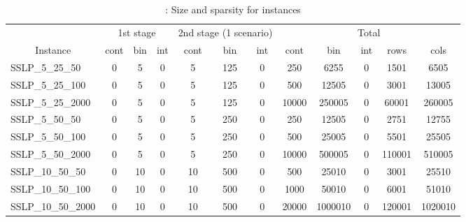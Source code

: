 \subsection{\suc}
\begin{table}[H]
	\centering
	\caption{\dcap: Size and sparsity for instances}
	\label{table:instance_size_info_dcap}
		\begin{tabular}{|l|ccc|ccc|ccccc|}
			\hline
			& \multicolumn{3}{c|}{1st stage} & \multicolumn{3}{c|}{2nd stage (1 scenario)} & \multicolumn{5}{c|}{Total}               \\ \cline{2-12} 
			\multicolumn{1}{|c|}{Instance} & cont      & bin      & int     & cont          & bin          & int          & cont  & bin     & int & rows   & cols    \\ \hline
			SSLP\_5\_25\_50                & 0         & 5        & 0       & 5             & 125          & 0            & 250   & 6255    & 0   & 1501   & 6505    \\
			SSLP\_5\_25\_100               & 0         & 5        & 0       & 5             & 125          & 0            & 500   & 12505   & 0   & 3001   & 13005   \\
			SSLP\_5\_25\_2000              & 0         & 5        & 0       & 5             & 125          & 0            & 10000 & 250005  & 0   & 60001  & 260005  \\
			SSLP\_5\_50\_50                & 0         & 5        & 0       & 5             & 250          & 0            & 250   & 12505   & 0   & 2751   & 12755   \\
			SSLP\_5\_50\_100               & 0         & 5        & 0       & 5             & 250          & 0            & 500   & 25005   & 0   & 5501   & 25505   \\
			SSLP\_5\_50\_2000              & 0         & 5        & 0       & 5             & 250          & 0            & 10000 & 500005  & 0   & 110001 & 510005  \\
			SSLP\_10\_50\_50               & 0         & 10       & 0       & 10            & 500          & 0            & 500   & 25010   & 0   & 3001   & 25510   \\
			SSLP\_10\_50\_100              & 0         & 10       & 0       & 10            & 500          & 0            & 1000  & 50010   & 0   & 6001   & 51010   \\
			SSLP\_10\_50\_2000             & 0         & 10       & 0       & 10            & 500          & 0            & 20000 & 1000010 & 0   & 120001 & 1020010 \\

\end{tabular}
\end{table}
